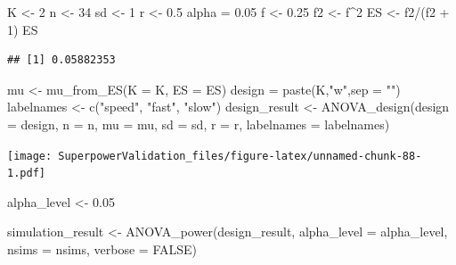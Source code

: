 \documentclass[
]{book}
\newenvironment{Shaded}{\begin{snugshade}}{\end{snugshade}}
\newcommand{\AttributeTok}[1]{\textcolor[rgb]{0.77,0.63,0.00}{#1}}
\newcommand{\ConstantTok}[1]{\textcolor[rgb]{0.00,0.00,0.00}{#1}}
\newcommand{\DecValTok}[1]{\textcolor[rgb]{0.00,0.00,0.81}{#1}}
\newcommand{\FloatTok}[1]{\textcolor[rgb]{0.00,0.00,0.81}{#1}}
\newcommand{\FunctionTok}[1]{\textcolor[rgb]{0.00,0.00,0.00}{#1}}
\newcommand{\NormalTok}[1]{#1}
\newcommand{\OtherTok}[1]{\textcolor[rgb]{0.56,0.35,0.01}{#1}}
\newcommand{\SpecialCharTok}[1]{\textcolor[rgb]{0.00,0.00,0.00}{#1}}
\newcommand{\StringTok}[1]{\textcolor[rgb]{0.31,0.60,0.02}{#1}}
\begin{document}
\begin{Shaded}
\begin{Highlighting}[]
\NormalTok{K }\OtherTok{\textless{}{-}} \DecValTok{2}
\NormalTok{n }\OtherTok{\textless{}{-}} \DecValTok{34}
\NormalTok{sd }\OtherTok{\textless{}{-}} \DecValTok{1}
\NormalTok{r }\OtherTok{\textless{}{-}} \FloatTok{0.5}
\NormalTok{alpha }\OtherTok{=} \FloatTok{0.05}
\NormalTok{f }\OtherTok{\textless{}{-}} \FloatTok{0.25}
\NormalTok{f2 }\OtherTok{\textless{}{-}}\NormalTok{ f}\SpecialCharTok{\^{}}\DecValTok{2}
\NormalTok{ES }\OtherTok{\textless{}{-}}\NormalTok{ f2}\SpecialCharTok{/}\NormalTok{(f2 }\SpecialCharTok{+} \DecValTok{1}\NormalTok{)}
\NormalTok{ES}
\end{Highlighting}
\end{Shaded}

\begin{verbatim}
## [1] 0.05882353
\end{verbatim}

\begin{Shaded}
\begin{Highlighting}[]
\NormalTok{mu }\OtherTok{\textless{}{-}} \FunctionTok{mu\_from\_ES}\NormalTok{(}\AttributeTok{K =}\NormalTok{ K, }\AttributeTok{ES =}\NormalTok{ ES)}
\NormalTok{design }\OtherTok{=} \FunctionTok{paste}\NormalTok{(K,}\StringTok{"w"}\NormalTok{,}\AttributeTok{sep =} \StringTok{""}\NormalTok{)}
\NormalTok{labelnames }\OtherTok{\textless{}{-}} \FunctionTok{c}\NormalTok{(}\StringTok{"speed"}\NormalTok{, }\StringTok{"fast"}\NormalTok{, }\StringTok{"slow"}\NormalTok{)}
\NormalTok{design\_result }\OtherTok{\textless{}{-}} \FunctionTok{ANOVA\_design}\NormalTok{(}\AttributeTok{design =}\NormalTok{ design,}
                   \AttributeTok{n =}\NormalTok{ n, }\AttributeTok{mu =}\NormalTok{ mu, }\AttributeTok{sd =}\NormalTok{ sd, }\AttributeTok{r =}\NormalTok{ r, }
                   \AttributeTok{labelnames =}\NormalTok{ labelnames)}
\end{Highlighting}
\end{Shaded}

\texttt{[image: SuperpowerValidation\_files/figure-latex/unnamed-chunk-88-1.pdf]}

\begin{Shaded}
\begin{Highlighting}[]
\NormalTok{alpha\_level }\OtherTok{\textless{}{-}} \FloatTok{0.05}
\end{Highlighting}
\end{Shaded}

\begin{Shaded}
\begin{Highlighting}[]
\NormalTok{simulation\_result }\OtherTok{\textless{}{-}} \FunctionTok{ANOVA\_power}\NormalTok{(design\_result, }
                                 \AttributeTok{alpha\_level =}\NormalTok{ alpha\_level, }
                                 \AttributeTok{nsims =}\NormalTok{ nsims, }\AttributeTok{verbose =} \ConstantTok{FALSE}\NormalTok{)}
\end{Highlighting}
\end{Shaded}
\end{document}
